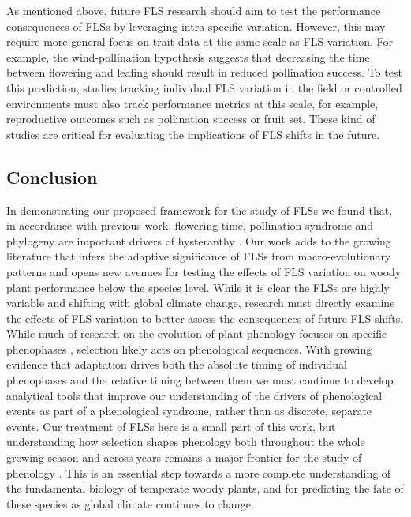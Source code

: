 \documentclass[11pt]{article}
\begin{document}
{\noindent As mentioned above, future FLS research should aim to test the performance consequences of FLSs by leveraging intra-specific variation. However, this may require more general focus on trait data at the same scale as FLS variation. For example, the wind-pollination hypothesis suggests that decreasing the time between flowering and leafing should result in reduced pollination success. To test this prediction, studies tracking individual FLS variation  in the field or controlled environments must also track performance metrics at this scale, for example, reproductive outcomes such as pollination success or fruit set. These kind of studies are critical for evaluating the implications of FLS shifts in the future. \\

\subsection*{Conclusion}
\noindent In demonstrating our proposed framework for the study of FLSs we found that, in accordance with previous work, flowering time, pollination syndrome and phylogeny are important drivers of hysteranthy \citep{Gougherty2018}. Our work adds to the growing literature that infers the adaptive significance of FLSs from macro-evolutionary patterns and opens new avenues for testing the effects of FLS variation on woody plant performance below the species level. While it is clear the FLSs are highly variable and shifting with global climate change, research must directly examine the effects of FLS variation to better assess the consequences of future FLS shifts.\\

\noindent While much of research on the evolution of plant phenology focuses on specific phenophases \citep[e.g.][]{Savage2013,OLLERTON_1992}, selection likely acts on phenological sequences. With growing evidence that adaptation drives both the absolute timing of individual phenophases and the relative timing between them we must continue to develop analytical tools that improve our understanding of the drivers of phenological events as part of a phenological syndrome, rather than as discrete, separate events. 
Our treatment of FLSs here is a small part of this work, but understanding how selection shapes phenology both throughout the whole growing season and across years remains a major frontier for the study of phenology \citep{Wolkovich2014b}. This is an essential step towards a more complete understanding of the fundamental biology of temperate woody plants, and for predicting the fate of these species as global climate continues to change.


}
\end{document}
